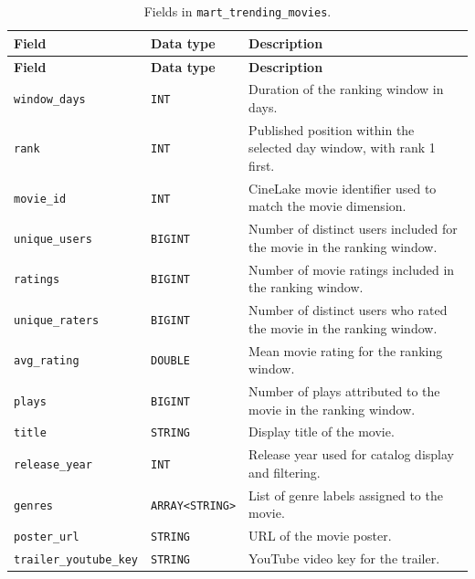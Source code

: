 \documentclass[a4paper,12pt]{article}
\newcommand{\dbsep}{\_\allowbreak}
\begin{document}
\begingroup
\small
\setlength{\tabcolsep}{4pt}
\renewcommand{\arraystretch}{1.1}
\begin{longtable}{@{}>{\raggedright\arraybackslash}p{}
                    >{\raggedright\arraybackslash}p{}
                    >{\raggedright\arraybackslash}p{}@{}}
\caption{Fields in \texttt{mart\dbsep trending\dbsep movies}.}\\
\toprule
\textbf{Field} & \textbf{Data type} & \textbf{Description}\\
\midrule
\endfirsthead
\toprule
\textbf{Field} & \textbf{Data type} & \textbf{Description}\\
\midrule
\endhead
\bottomrule
\endfoot
\texttt{window\dbsep days} & \texttt{INT} & Duration of the ranking window in days.\\
\texttt{rank} & \texttt{INT} & Published position within the selected day window, with rank 1 first.\\
\texttt{movie\dbsep id} & \texttt{INT} & CineLake movie identifier used to match the movie dimension.\\
\texttt{unique\dbsep users} & \texttt{BIGINT} & Number of distinct users included for the movie in the ranking window.\\
\texttt{ratings} & \texttt{BIGINT} & Number of movie ratings included in the ranking window.\\
\texttt{unique\dbsep raters} & \texttt{BIGINT} & Number of distinct users who rated the movie in the ranking window.\\
\texttt{avg\dbsep rating} & \texttt{DOUBLE} & Mean movie rating for the ranking window.\\
\texttt{plays} & \texttt{BIGINT} & Number of plays attributed to the movie in the ranking window.\\
\texttt{title} & \texttt{STRING} & Display title of the movie.\\
\texttt{release\dbsep year} & \texttt{INT} & Release year used for catalog display and filtering.\\
\texttt{genres} & \texttt{ARRAY\allowbreak\textless{}STRING\textgreater{}} & List of genre labels assigned to the movie.\\
\texttt{poster\dbsep url} & \texttt{STRING} & URL of the movie poster.\\
\texttt{trailer\dbsep youtube\dbsep key} & \texttt{STRING} & YouTube video key for the trailer.\\
\end{longtable}
\endgroup
\end{document}
